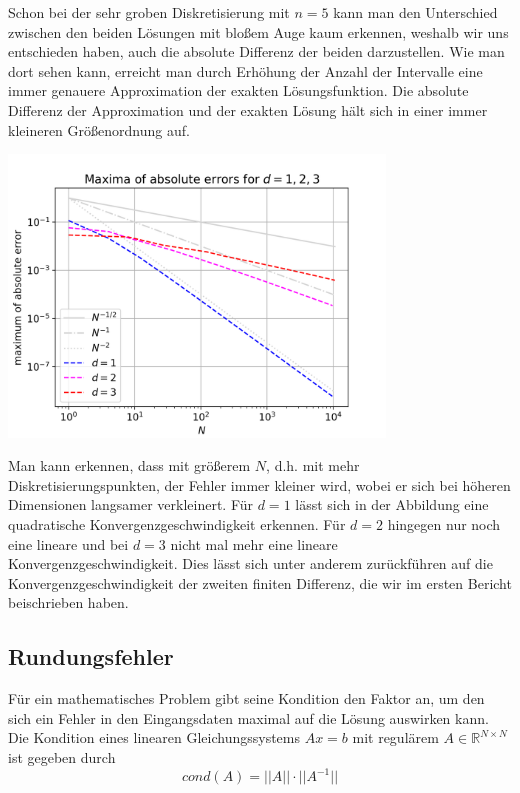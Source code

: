 \documentclass{scrartcl}
\begin{document}
Schon bei der sehr groben Diskretisierung mit $n=5$ kann man den Unterschied zwischen den beiden Lösungen mit bloßem Auge kaum erkennen, weshalb wir uns entschieden haben, auch die absolute Differenz der beiden darzustellen.
Wie man dort sehen kann, erreicht man durch Erhöhung der Anzahl der Intervalle eine immer genauere Approximation der exakten Lösungsfunktion. Die absolute Differenz der Approximation und der exakten Lösung hält sich in einer immer kleineren Größenordnung auf.

{
  \centering
    \includegraphics[width=0.75\textwidth]{Grafiken/loglogerr_d123_neu}
    \vspace{-0.2cm}
}
\vspace{0.5cm}

Man kann erkennen, dass mit größerem $N$, d.h. mit mehr Diskretisierungspunkten, der Fehler immer kleiner wird, wobei er sich bei höheren Dimensionen langsamer verkleinert.
Für $d=1$ lässt sich in der Abbildung eine quadratische Konvergenzgeschwindigkeit erkennen. Für $d=2$ hingegen nur noch eine lineare und bei $d=3$ nicht mal mehr eine lineare Konvergenzgeschwindigkeit. Dies lässt sich unter anderem zurückführen auf die Konvergenzgeschwindigkeit der zweiten finiten Differenz, die wir im ersten Bericht beischrieben haben.


\subsection{Rundungsfehler}
Für ein mathematisches Problem gibt seine Kondition den Faktor an, um den sich ein Fehler in den Eingangsdaten maximal auf die Lösung auswirken kann.
Die Kondition eines linearen Gleichungssystems $Ax = b$ mit regulärem $A\in\mathbb{R}^{N \times N}$ ist gegeben durch
\[cond(A) = ||A||\cdot||A^{-1}||\]\cite{tischendorf2019}
\end{document}
